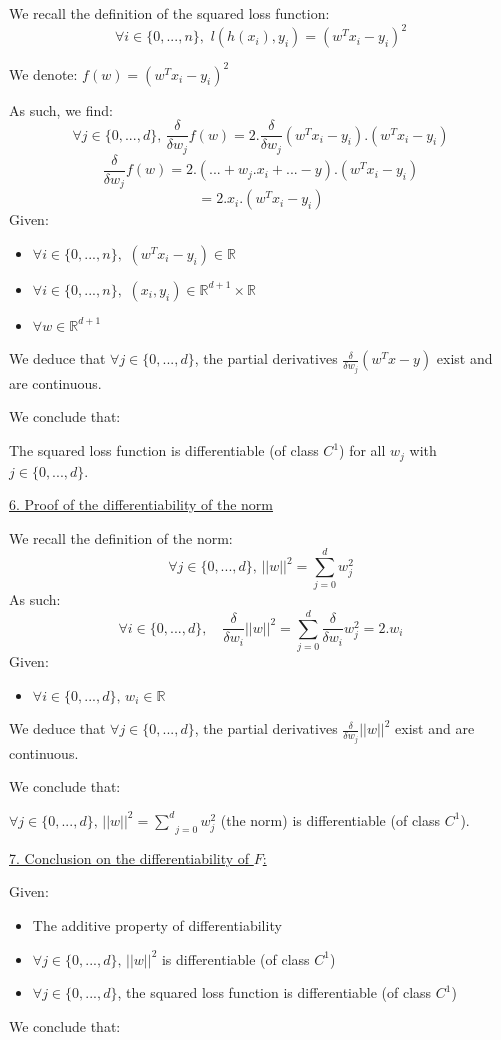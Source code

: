 \documentclass{homework}
\begin{document}
We recall the definition of the squared loss function: 
$$\forall i\in\{0,...,n\},\,\, l(h(x_i), y_i)=(w^Tx_i - y_i)^2$$ 

We denote: $f(w)=(w^Tx_i-y_i)^2$

As such, we find:
$$\forall j \in\{0,...,d\},\, \frac{\delta}{\delta w_j}f(w)=2.\frac{\delta}{\delta w_j}(w^Tx_i - y_i).(w^Tx_i - y_i)$$
$$\frac{\delta}{\delta w_j}f(w)=2.(...+w_j.x_i+...-y).(w^Tx_i - y_i)$$
$$=2.x_i.(w^Tx_i-y_i)$$
Given:
\begin{itemize}
    \item $\forall i \in \{0,...,n\},\,\,(w^Tx_i-y_i)\in\mathbb{R}$
    \item $\forall i \in \{0,...,n\},\,\,(x_i, y_i)\in\mathbb{R}^{d+1}\times\mathbb{R}$
    \item $\forall w\in\mathbb{R}^{d+1}$
\end{itemize}
We deduce that $\forall j\in\{0,...,d\}$, the partial derivatives $\frac{\delta}{\delta w_j}(w^Tx-y)$ exist and are continuous.

We conclude that: 

\textcolor{OliveGreen}{The squared loss function is differentiable (of class $C^1$) for all $w_j$ with $j\in\{0,...,d\}$.}

\underline{6. Proof of the differentiability of the norm}

We recall the definition of the norm: 
$$\forall j\in\{0,...,d\},\,||w||^2=\underset{j=0}{\overset{d}{\sum}}w_j^2$$
As such:
$$\forall i\in\{0,...,d\},\quad\frac{\delta}{\delta w_i}||w||^2=\underset{j=0}{\overset{d}{\sum}}\frac{\delta}{\delta w_i}w_j^2=2.w_i$$
Given:
\begin{itemize}
    \item $\forall i\in\{0,...,d\},\,w_i\in\mathbb{R}$
\end{itemize}
We deduce that $\forall j\in\{0,...,d\}$, the partial derivatives $\frac{\delta}{\delta w_j}||w||^2$ exist and are continuous.

We conclude that: 

\textcolor{OliveGreen}{$\forall j\in\{0,...,d\},\, ||w||^2=\underset{j=0}{\overset{d}{\sum}}w_j^2$ (the norm) is 
differentiable (of class $C^1$).}

\underline{7. Conclusion on the differentiability of $F$:}

Given:
\begin{itemize}
    \item The additive property of differentiability
    \item $\forall j\in\{0,...,d\},\,||w||^2$ is differentiable (of class $C^1$) 
    \item $\forall j\in\{0,...,d\}$, the squared loss function is differentiable (of class $C^1$) 
\end{itemize}
We conclude that: 
\end{document}
